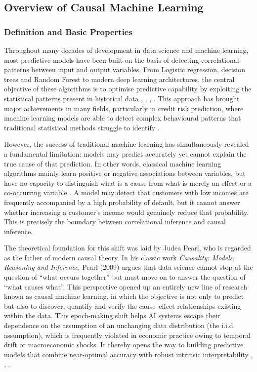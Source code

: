 \subsection{Overview of Causal Machine Learning}

\subsubsection{Definition and Basic Properties}
\noindent
Throughout many decades of development in data science and machine learning, most predictive models have been built on the basis of detecting correlational patterns between input and output variables. From Logistic regression, decision trees and Random Forest to modern deep learning architectures, the central objective of these algorithms is to optimise predictive capability by exploiting the statistical patterns present in historical data \cite{lessmann2015benchmarking}, \cite{vapnik1998statistical}, \cite{breiman2001random}, \cite{friedman2001greedy}. This approach has brought major achievements in many fields, particularly in credit risk prediction, where machine learning models are able to detect complex behavioural patterns that traditional statistical methods struggle to identify \cite{lessmann2015benchmarking}.

However, the success of traditional machine learning has simultaneously revealed a fundamental limitation: models may predict accurately yet cannot explain the true cause of that prediction. In other words, classical machine learning algorithms mainly learn positive or negative associations between variables, but have no capacity to distinguish what is a cause from what is merely an effect or a co-occurring variable \cite{pearl2009causality}. A model may detect that customers with low incomes are frequently accompanied by a high probability of default, but it cannot answer whether increasing a customer's income would genuinely reduce that probability. This is precisely the boundary between correlational inference and causal inference.

The theoretical foundation for this shift was laid by Judea Pearl, who is regarded as the father of modern causal theory. In his classic work \textit{Causality: Models, Reasoning and Inference}, Pearl (2009) \cite{pearl2009causality} argues that data science cannot stop at the question of ``what occurs together'' but must move on to answer the question of ``what causes what''. This perspective opened up an entirely new line of research known as causal machine learning, in which the objective is not only to predict but also to discover, quantify and verify the cause--effect relationships existing within the data. This epoch-making shift helps AI systems escape their dependence on the assumption of an unchanging data distribution (the i.i.d. assumption), which is frequently violated in economic practice owing to temporal drift or macroeconomic shocks. It thereby opens the way to building predictive models that combine near-optimal accuracy with robust intrinsic interpretability \cite{sigrist2019grabit}, \cite{liu2024credit}, \cite{scholkopf2021causal}.

